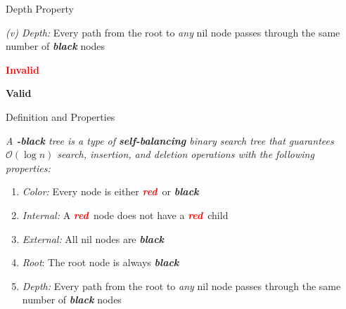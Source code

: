 \documentclass[aspectratio=169]{beamer}
\newcommand{\textib}[1]{\textit{\textbf{{#1}}}}
\newcommand{\red}{\textib{\textcolor{red}{red}}}
\newenvironment{define}{\begin{tcolorbox}[title={Definition}]\begin{small}}{\end{small}\end{tcolorbox}}
\begin{document}
\begin{frame}[fragile]{Depth Property}
    \vspace{-3em}

    \begin{minipage}[t][0.2\textheight][c]{\linewidth}
        \textit{(v) Depth:} Every path from the root to \textit{any} nil node passes through the same number
        of \textib{black} nodes
    \end{minipage}
    \vspace{-3em}

    \begin{minipage}[t][0.6\textheight][c]{\linewidth}
         {
            \depthone
        }
         {\depthtwo}
         {\textbf{\textcolor{red}{Invalid}}}
        \vspace{1.1em}

         {\depththree}
         {
            \vspace{-2em}
            \textbf{Valid}
        }
    \end{minipage}
\end{frame}



\begin{frame}[fragile]{Definition and Properties}
    \begin{define}
        \it
        {
            A \textib{\color{red}{red}}\textib{-black} tree is a type of \textib{self-balancing} binary
            search tree that guarantees $\mathcal{O}(\log n)$ search, insertion, and deletion operations
            with the following properties:
        }
    \end{define}
    \begin{enumerate}[label=\textit{(\roman*)}]
        \item \textit{Color:} Every node is either \red \ or \textib{black}
        \item \textit{Internal:} A \red \ node does not have a \red \ child
        \item \textit{External:} All nil nodes are \textib{black}
        \item \textit{Root}: The root node is always \textib{black}
        \item \textit{Depth:} Every path from the root to \textit{any} nil node passes through
            the same number of \textib{black} nodes
    \end{enumerate}
\end{frame}
\end{document}
